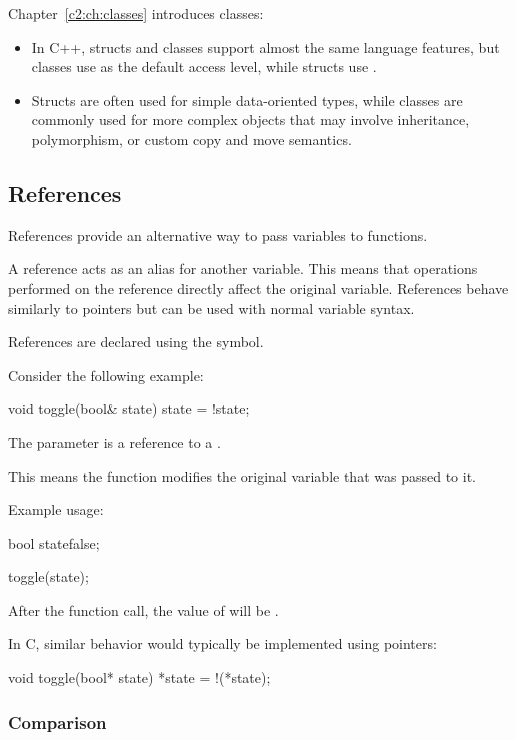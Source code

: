 \noindent Chapter~\ref{c2:ch:classes} introduces classes:
\begin{itemize}
  \item In C++, structs and classes support almost the same language features, but classes use
     as the default access level, while structs use .
  \item Structs are often used for simple data-oriented types, while classes are commonly used for
    more complex objects that may involve inheritance, polymorphism, or custom copy and move
    semantics.
\end{itemize}

\subsection{References}
\label{c1:sec:references}
References provide an alternative way to pass variables to functions.

A reference acts as an alias for another variable. This means that operations performed on the
reference directly affect the original variable. References behave similarly to pointers but can
be used with normal variable syntax.

References are declared using the \code{&} symbol.

Consider the following example:

\begin{cppcode}
void toggle(bool& state)
{
    state = !state;
}
\end{cppcode}

\noindent The parameter  is a reference to a .

This means the function modifies the original variable that was passed to it.

Example usage:

\begin{cppcode}
bool state{false};

toggle(state);
\end{cppcode}

\noindent After the function call, the value of  will be .

In C, similar behavior would typically be implemented using pointers:

\begin{ccode}
void toggle(bool* state)
{
    *state = !(*state);
}
\end{ccode}

\subsubsection{Comparison}
